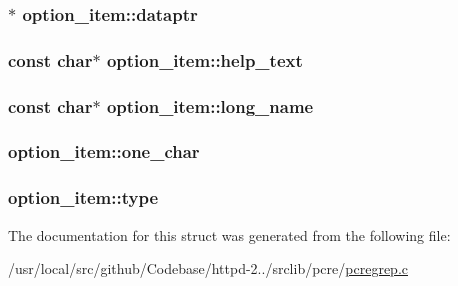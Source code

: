 \subsubsection[{\texorpdfstring{dataptr}{dataptr}}]{$\ast$ option\+\_\+item\+::dataptr}\hypertarget{structoption__item_ae685fbc6cfd991e87b381fbbf75d3610}{}\label{structoption__item_ae685fbc6cfd991e87b381fbbf75d3610}
\subsubsection[{\texorpdfstring{help\+\_\+text}{help_text}}]{\setlength{\rightskip}{0pt plus 5cm}const char$\ast$ option\+\_\+item\+::help\+\_\+text}\hypertarget{structoption__item_a6b61195f7c186780fb199aaad1ed288e}{}\label{structoption__item_a6b61195f7c186780fb199aaad1ed288e}
\subsubsection[{\texorpdfstring{long\+\_\+name}{long_name}}]{\setlength{\rightskip}{0pt plus 5cm}const char$\ast$ option\+\_\+item\+::long\+\_\+name}\hypertarget{structoption__item_a38272f77aaf451048e4f8add760686dd}{}\label{structoption__item_a38272f77aaf451048e4f8add760686dd}
\subsubsection[{\texorpdfstring{one\+\_\+char}{one_char}}]{ option\+\_\+item\+::one\+\_\+char}\hypertarget{structoption__item_a3128d3758603f8be2b78df4760061e5b}{}\label{structoption__item_a3128d3758603f8be2b78df4760061e5b}
\subsubsection[{\texorpdfstring{type}{type}}]{ option\+\_\+item\+::type}\hypertarget{structoption__item_abdc24134c8aceecdcd6c543fd7680998}{}\label{structoption__item_abdc24134c8aceecdcd6c543fd7680998}


The documentation for this struct was generated from the following file\+:\begin{DoxyCompactItemize}
\item 
/usr/local/src/github/\+Codebase/httpd-\/2../srclib/pcre/\hyperlink{pcregrep_8c}{pcregrep.\+c}\end{DoxyCompactItemize}
